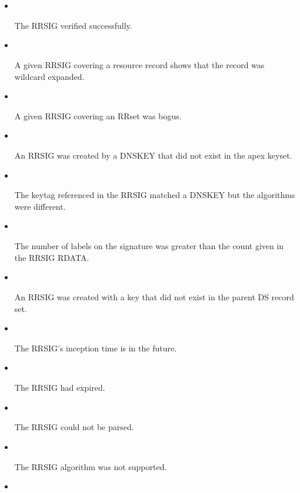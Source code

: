 \begin{description}
\begin{description}
\begin{itemize}
\item {}\verb" "

The RRSIG verified successfully.

\item {}\verb" "

A given RRSIG covering a resource record shows that the record was wildcard
expanded.

\item {}\verb" "

A given RRSIG covering an RRset was bogus.

\item {}\verb" "

An RRSIG was created by a DNSKEY that did not exist in the apex keyset.

\item {}\verb" "

The keytag referenced in the RRSIG matched a DNSKEY but the algorithms were
different.

\item {}\verb" "

The number of labels on the signature was greater than the count given in
the RRSIG RDATA.

\item {}\verb" "

An RRSIG was created with a key that did not exist in the parent DS record
set.

\item {}\verb" "

The RRSIG's inception time is in the future.

\item {}\verb" "

The RRSIG had expired.

\item {}\verb" "

The RRSIG could not be parsed.

\item {}\verb" "

The RRSIG algorithm was not supported.

\item {}\verb" "


\end{itemize}
\end{description}
\end{description}
